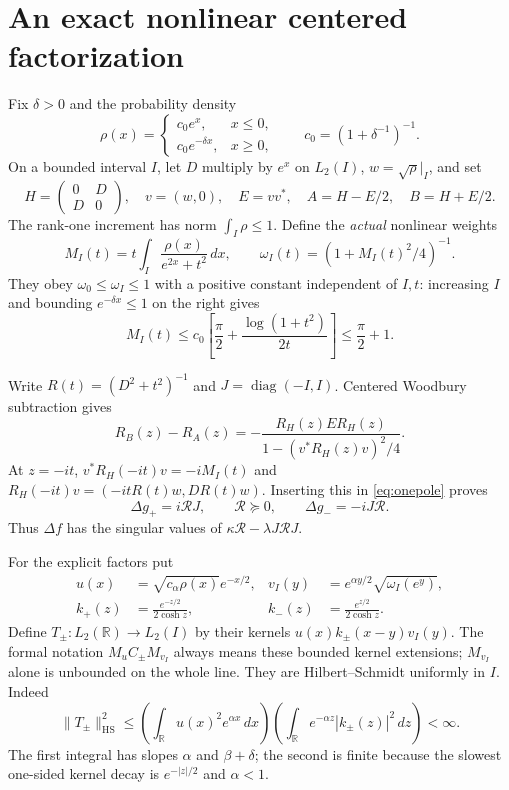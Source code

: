 \documentclass[11pt]{article}
\numberwithin{equation}{section}
\newcommand{\R}{\mathbb R}
\newcommand{\diag}{\operatorname{diag}}
\begin{document}
\section{An exact nonlinear centered factorization}

Fix $\delta>0$ and the probability density
\begin{equation}\label{eq:rho}
 \rho(x)=\begin{cases}c_0e^x,&x\le0,\\c_0e^{-\delta x},&x\ge0,
 \end{cases}\qquad c_0=(1+\delta^{-1})^{-1}.
\end{equation}
On a bounded interval $I$, let $D$ multiply by $e^x$ on $L_2(I)$,
$w=\sqrt\rho|_I$, and set
\begin{equation}\label{eq:pair}
 H=\begin{pmatrix}0&D\\D&0\end{pmatrix},\quad
 v=(w,0),\quad E=vv^*,\quad A=H-E/2,\quad B=H+E/2.
\end{equation}
The rank-one increment has norm $\int_I\rho\le1$.
Define the \emph{actual} nonlinear weights
\begin{equation}\label{eq:omega}
 M_I(t)=t\int_I\frac{\rho(x)}{e^{2x}+t^2}\,dx,
 \qquad \omega_I(t)=(1+M_I(t)^2/4)^{-1}.
\end{equation}
They obey $\omega_0\le\omega_I\le1$ with a positive constant independent
of $I,t$: increasing $I$ and bounding $e^{-\delta x}\le1$ on the
right gives
\[
 M_I(t)\le c_0\left[\frac\pi2+
                   \frac{\log(1+t^2)}{2t}\right]\le\frac\pi2+1.
\]

Write $R(t)=(D^2+t^2)^{-1}$ and $J=\diag(-I,I)$. Centered Woodbury
subtraction gives
\[
 R_B(z)-R_A(z)=-\frac{R_H(z)ER_H(z)}{1-(v^*R_H(z)v)^2/4}.
\]
At $z=-it$, $v^*R_H(-it)v=-iM_I(t)$ and
$R_H(-it)v=(-itR(t)w,DR(t)w)$. Inserting this in
\eqref{eq:onepole} proves
\begin{equation}\label{eq:RJ}
 \Delta g_+=i\mathcal R J,\qquad \mathcal R\succeq0,
 \qquad \Delta g_-=-iJ\mathcal R.
\end{equation}
Thus $\Delta f$ has the singular values of
$\kappa\mathcal R-\lambda J\mathcal R J$.

For the explicit factors put
\begin{align}
 u(x)&=\sqrt{c_\alpha\rho(x)}e^{-x/2},&
 v_I(y)&=e^{\alpha y/2}\sqrt{\omega_I(e^y)},\label{eq:weights}\\
 k_+(z)&=\frac{e^{-z/2}}{2\cosh z},&
 k_-(z)&=\frac{e^{z/2}}{2\cosh z}.\nonumber
\end{align}
Define $T_\pm:L_2(\R)\to L_2(I)$ by their kernels
$u(x)k_\pm(x-y)v_I(y)$. The formal notation $M_u C_\pm M_{v_I}$
always means these bounded kernel extensions; $M_{v_I}$ alone is
unbounded on the whole line. They are Hilbert--Schmidt uniformly in
$I$. Indeed
\begin{equation}\label{eq:HS}
 \|T_\pm\|_{\mathrm{HS}}^2\le
 \left(\int_\R u(x)^2e^{\alpha x}\,dx\right)
 \left(\int_\R e^{-\alpha z}|k_\pm(z)|^2\,dz\right)<\infty.
\end{equation}
The first integral has slopes $\alpha$ and $\beta+\delta$; the
second is finite because the slowest one-sided kernel decay is
$e^{-|z|/2}$ and $\alpha<1$.
\end{document}
